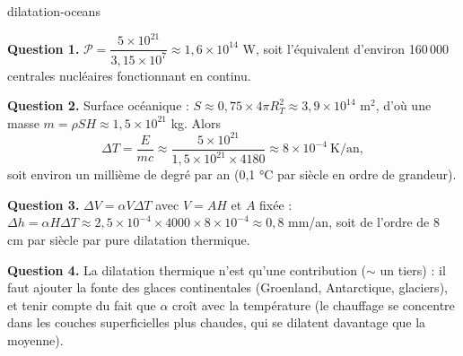 \begin{exo}{dilatation-oceans}
\begin{solution}
\textbf{Question 1.} $\mathcal{P} = \dfrac{5\times10^{21}}{3{,}15\times10^7} \approx 1{,}6\times10^{14}$ W, soit l'équivalent d'environ 160\,000 centrales nucléaires fonctionnant en continu.

\textbf{Question 2.} Surface océanique : $S \approx 0{,}75\times4\pi R_T^2 \approx 3{,}9\times10^{14}$ m$^2$, d'où une masse $m = \rho SH \approx 1{,}5\times10^{21}$ kg. Alors
\[
\Delta T = \frac{E}{mc} \approx \frac{5\times10^{21}}{1{,}5\times10^{21}\times4180} \approx 8\times10^{-4}\ \text{K/an},
\]
soit environ un millième de degré par an (0,1 °C par siècle en ordre de grandeur).

\textbf{Question 3.} $\Delta V = \alpha V\Delta T$ avec $V = AH$ et $A$ fixée : $\Delta h = \alpha H\Delta T \approx 2{,}5\times10^{-4}\times4000\times8\times10^{-4} \approx 0{,}8$ mm/an, soit de l'ordre de 8 cm par siècle par pure dilatation thermique.

\textbf{Question 4.} La dilatation thermique n'est qu'une contribution ($\sim$ un tiers) : il faut ajouter la fonte des glaces continentales (Groenland, Antarctique, glaciers), et tenir compte du fait que $\alpha$ croît avec la température (le chauffage se concentre dans les couches superficielles plus chaudes, qui se dilatent davantage que la moyenne).
\end{solution}
\end{exo}

